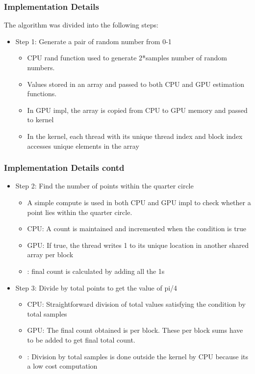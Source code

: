\documentclass[mathserif]{beamer}
\begin{document}
\begin{frame}                                                                                                                                                                          
\frametitle{Implementation Details}
The algorithm was divided into the following steps:
\begin{itemize}
\item Step 1: Generate a pair of random number from 0-1
\begin{itemize}
\item CPU rand function used to generate 2*samples number of random numbers.  
\item Values stored in an array and passed to both CPU and GPU estimation functions.
\item In GPU impl, the array is copied from CPU to GPU memory and passed to kernel
\item In the kernel, each thread with its unique thread index and block index accesses unique elements in the array
\end{itemize}
\end{itemize}
\end{frame}              

\begin{frame}                                                                                                                                                                          
\frametitle{Implementation Details contd}
\begin{itemize}
\item Step 2: Find the number of points within the quarter circle
\begin{itemize}
\item A simple compute is used in both CPU and GPU impl to check whether a point lies within the quarter circle. 
\item CPU: A count is maintained and incremented when the condition is true
\item GPU: If true, the thread writes 1 to its unique location in another shared array per block
\item    :  final count is calculated by adding all the 1s 
\end{itemize}
\item Step 3: Divide by total points to get the value of pi/4
\begin{itemize}
\item CPU: Straightforward division of total values satisfying the condition by total samples 
\item GPU: The final count obtained is per block. These per block sums have to be added to get final total count. 
\item    : Division by total samples is done outside the kernel by CPU because its a low cost computation
\end{itemize}
\end{itemize}
\end{frame}              
 
\end{document}
